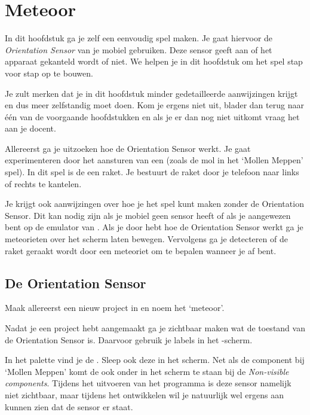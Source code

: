 \chapter{Meteoor}

In dit hoofdstuk ga je zelf een eenvoudig spel maken. Je gaat hiervoor de \emph{Orientation Sensor} van je mobiel gebruiken. Deze sensor geeft aan of het apparaat gekanteld wordt of niet. We helpen je in dit hoofdstuk om het spel stap voor stap op te bouwen.

Je zult merken dat je in dit hoofdstuk minder gedetailleerde aanwijzingen krijgt en dus meer zelfstandig moet doen. Kom je ergens niet uit, blader dan terug naar \'e\'en van de voorgaande hoofdstukken en als je er dan nog niet uitkomt vraag het aan je docent.

Allereerst ga je uitzoeken hoe de Orientation Sensor werkt. Je gaat experimenteren door het aansturen van een  (zoals de mol in het `Mollen Meppen' spel). In dit spel is de  een raket. Je bestuurt de raket door je telefoon naar links of rechts te kantelen.

Je krijgt ook aanwijzingen over hoe je het spel kunt maken zonder de Orientation Sensor. Dit kan nodig zijn als je mobiel geen sensor heeft of als je aangewezen bent op de emulator van \ai. Als je door hebt hoe de Orientation Sensor werkt ga je meteorieten over het scherm laten bewegen. Vervolgens ga je detecteren of de raket geraakt wordt door een meteoriet om te bepalen wanneer je af bent.


\section{De Orientation Sensor}
\begin{opgave}
    \opgVraag
  Maak allereerst een nieuw project in \ai en noem het `meteoor'.
\end{opgave}

Nadat je een project hebt aangemaakt ga je zichtbaar maken wat de toestand van de Orientation Sensor is. Daarvoor gebruik je labels in het -scherm.

In het  palette vind je de . Sleep ook deze in het scherm. Net als de  component bij `Mollen Meppen' komt de  ook onder in het scherm te staan bij de \emph{Non-visible components}. Tijdens het uitvoeren van het programma is deze sensor namelijk niet zichtbaar, maar tijdens het ontwikkelen wil je natuurlijk wel ergens aan kunnen zien dat de sensor er staat. 

